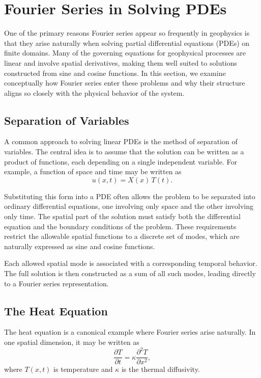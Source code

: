\section{Fourier Series in Solving PDEs}

One of the primary reasons Fourier series appear so frequently in geophysics is that they arise naturally when solving partial differential equations (PDEs) on finite domains. Many of the governing equations for geophysical processes are linear and involve spatial derivatives, making them well suited to solutions constructed from sine and cosine functions. In this section, we examine conceptually how Fourier series enter these problems and why their structure aligns so closely with the physical behavior of the system.

\subsection{Separation of Variables}

A common approach to solving linear PDEs is the method of separation of variables. The central idea is to assume that the solution can be written as a product of functions, each depending on a single independent variable. For example, a function of space and time may be written as
\begin{equation}
    u(x,t) = X(x)\,T(t).
\end{equation}

Substituting this form into a PDE often allows the problem to be separated into ordinary differential equations, one involving only space and the other involving only time. The spatial part of the solution must satisfy both the differential equation and the boundary conditions of the problem. These requirements restrict the allowable spatial functions to a discrete set of modes, which are naturally expressed as sine and cosine functions.

Each allowed spatial mode is associated with a corresponding temporal behavior. The full solution is then constructed as a sum of all such modes, leading directly to a Fourier series representation.

\subsection{The Heat Equation}

The heat equation is a canonical example where Fourier series arise naturally. In one spatial dimension, it may be written as
\begin{equation}
    \frac{\partial T}{\partial t} = \kappa \frac{\partial^2 T}{\partial x^2},
\end{equation}
where $T(x,t)$ is temperature and $\kappa$ is the thermal diffusivity.

